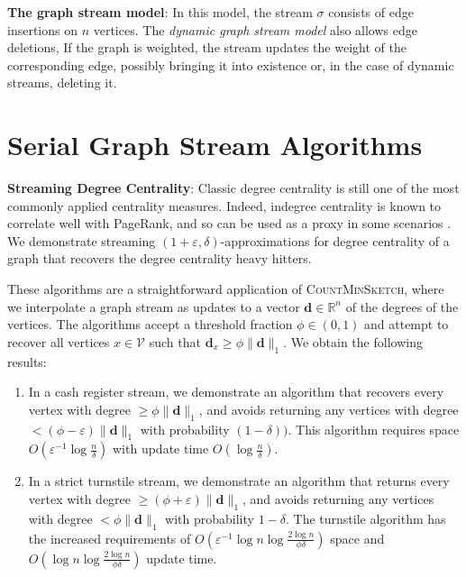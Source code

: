 \documentclass{report}
\newcommand{\algoname}[1]{\textnormal{\textsc{#1}}}
\begin{document}
\noindent
\textbf{The graph stream model}:
In this model, the stream $\sigma$ consists of edge insertions on $n$ vertices. 
The \emph{dynamic graph stream model} also allows edge deletions,
If the graph is weighted, the stream updates the weight of the corresponding edge, possibly bringing it into existence or, in the case of dynamic streams, deleting it.


\section{Serial Graph Stream Algorithms} \label{intro:sec:serial_streaming}

\textbf{Streaming Degree Centrality}:
Classic degree centrality is still one of the most commonly applied centrality measures.
%
Indeed, indegree centrality is known to correlate well with PageRank, and so can be used as a proxy in some scenarios \cite{upstill2003predicting}.
We demonstrate streaming $(1+\varepsilon, \delta)$-approximations for degree centrality of a graph that recovers the degree centrality heavy hitters.

These algorithms are a straightforward application of \algoname{CountMinSketch}, where we interpolate a graph stream as updates to a vector $\mathbf{d} \in \mathbb{R}^n$ of the degrees of the vertices.
The algorithms accept a threshold fraction $\phi \in (0,1)$ and attempt to recover all vertices $x \in \mathcal{V}$ such that $\mathbf{d}_x \geq \phi \|\mathbf{d}\|_1$.
We obtain the following results:
\begin{enumerate}
	\item In a cash register stream, we demonstrate an algorithm that recovers every vertex with degree $\geq \phi \|\mathbf{d}\|_1$, and avoids returning any vertices with degree $< (\phi - \varepsilon) \|\mathbf{d}\|_1$ with probability $(1-\delta))$.
This algorithm requires space $O(\varepsilon^{-1} \log \frac{n}{\delta})$ with update time $O(\log \frac{n}{\delta})$.
	\item In a strict turnstile stream, we demonstrate an algorithm that returns every vertex with degree $\geq (\phi + \varepsilon) \|\mathbf{d}\|_1$, and avoids returning any vertices with degree $< \phi \|\mathbf{d}\|_1$ with probability $1 - \delta$. 
The turnstile algorithm has the increased requirements of $O(\varepsilon^{-1} \log n \log \frac{2 \log n}{\phi \delta})$ space and $O(\log n \log \frac{2\log n}{\phi \delta})$ update time.
\end{enumerate}
\end{document}
